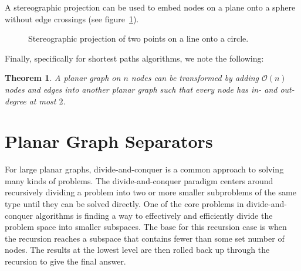 \documentclass[11pt]{article}
\newtheorem{theorem}{Theorem}[section]
\begin{document}
A stereographic projection can be used to embed nodes on a plane onto a sphere without edge crossings (see figure~\ref{fig:stereo}).

\begin{figure}[!htb]
  \centering
  \caption{Stereographic projection of two points on a line onto a circle.}
  \label{fig:stereo}
\end{figure}

Finally, specifically for shortest paths algorithms, we note the following:\\

\begin{theorem}
  A planar graph on $n$ nodes can be transformed by adding $\mathcal{O}(n)$ nodes and edges into another planar graph such that every node has in- and out-degree at most $2$.
\end{theorem}

\section{Planar Graph Separators}
\label{sec:graph-sep}


For large planar graphs, divide-and-conquer is a common approach to solving many kinds of problems. The divide-and-conquer paradigm centers around recursively dividing a problem into two or more smaller subproblems of the same type until they can be solved directly. One of the core problems in divide-and-conquer algorithms is finding a way to effectively and efficiently divide the problem space into smaller subspaces. The base for this recursion case is when the recursion reaches a subspace that contains fewer than some set number of nodes. The results at the lowest level are then rolled back up through the recursion to give the final answer.
\end{document}

